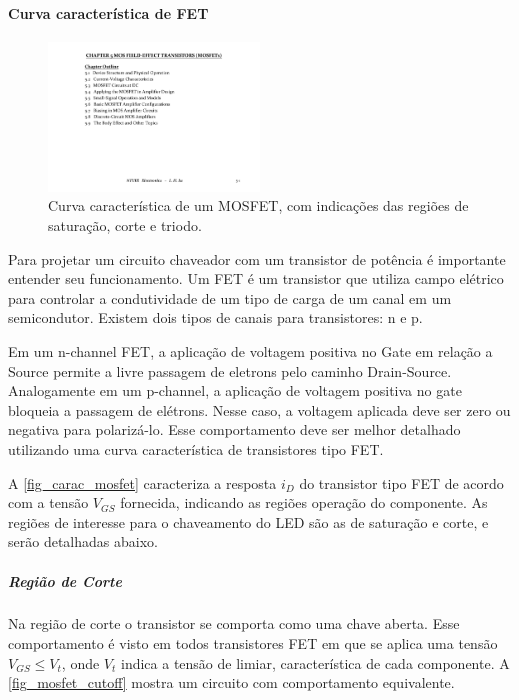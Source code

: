 	\paragraph{Curva característica de FET}
		
	\begin{figure}[htb]
		\caption{\label{fig_carac_mosfet} Curva característica de um MOSFET, com indicações das regiões de saturação, corte e triodo.}
		\centering
		\includegraphics[page=8,width=0.5\textwidth, trim={16.5cm 9.89cm 3.6cm 3cm},clip]{circuits/Electronics_Ch5.pdf}
	\end{figure}
	
	Para projetar um circuito chaveador com um transistor de potência é importante entender seu funcionamento. Um FET é um transistor que utiliza campo elétrico para controlar a condutividade de um tipo de carga de um canal em um semicondutor. Existem dois tipos de canais para transistores: n e p.
	
	Em um n-channel FET, a aplicação de voltagem positiva no Gate em relação a Source permite a livre passagem de eletrons pelo caminho Drain-Source. Analogamente em um p-channel, a aplicação de voltagem positiva no gate bloqueia a passagem de elétrons. Nesse caso, a voltagem aplicada deve ser zero ou negativa para polarizá-lo. Esse comportamento deve ser melhor detalhado utilizando uma curva característica de transistores tipo FET.

	A \autoref{fig_carac_mosfet} caracteriza a resposta $i_{D}$ do transistor tipo FET de acordo com a tensão $V_{GS}$ fornecida, indicando as regiões operação do componente. As regiões de interesse para o chaveamento do LED são as de saturação e corte, e serão detalhadas abaixo.
	
	\subparagraph{Região de Corte}
	
	Na região de corte o transistor se comporta como uma chave aberta. Esse comportamento é visto em todos transistores FET em que se aplica uma tensão $V_{GS} \leq V_{t}$, onde $V_{t}$ indica a tensão de limiar, característica de cada componente. A \autoref{fig_mosfet_cutoff} mostra um circuito com comportamento equivalente.
	

